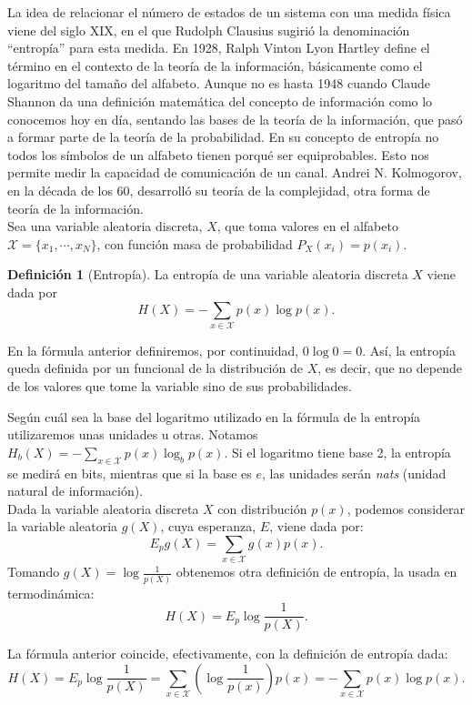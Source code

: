 \documentclass[10pt,a4paper]{article} %
\theoremstyle{definition}
\newtheorem{definition}{Definición}[section]
\begin{document}
    La idea de relacionar el número de estados de un sistema con una medida física viene del siglo XIX, en el que Rudolph Clausius sugirió la denominación ``entropía'' para esta medida. En 1928, Ralph Vinton Lyon Hartley define el término en el contexto de la teoría de la información, básicamente como el logaritmo del tamaño del alfabeto. Aunque no es hasta 1948 cuando Claude Shannon da una definición matemática del concepto de información como lo conocemos hoy en día,  sentando las bases de la teoría de la información, que pasó a formar parte de la teoría de la probabilidad. En su concepto de entropía no todos los símbolos de un alfabeto tienen porqué ser equiprobables. Esto nos permite medir la capacidad de comunicación de un canal. Andrei N. Kolmogorov, en la década de los 60, desarrolló su teoría de la complejidad, otra forma de teoría de la información.\\

Sea una variable aleatoria discreta, $X$, que toma valores en el alfabeto $\mathcal{X} = \{x_1, \cdots, x_N \}$, con función masa de probabilidad $P_X(x_i) = p(x_i)$.

\begin{definition}[Entropía]
  La entropía de una variable aleatoria discreta $X$ viene dada por \[H(X) = - \sum_{x\in \mathcal{X}} p(x) \log p(x).\]
\end{definition}

En la fórmula anterior definiremos, por continuidad, $0 \log 0 = 0$. Así, la entropía queda definida por un funcional de la distribución de $X$, es decir, que no depende de los valores que tome la variable sino de sus probabilidades.

Según cuál sea la base del logaritmo utilizado en la fórmula de la entropía utilizaremos unas unidades u otras. Notamos $H_b(X) = - \sum_{x\in \mathcal{X}} p(x) \log_b p(x)$. Si el logaritmo tiene base 2, la entropía se medirá en bits, mientras que si la base es $e$, las unidades serán \textit{nats} (unidad natural de información).\\

Dada la variable aleatoria discreta $X$ con distribución $p(x)$, podemos considerar la variable aleatoria $g(X)$, cuya esperanza, $E$, viene dada por:\[
E_pg(X) = \sum_{x\in \mathcal{X}}g(x)p(x).
\]
Tomando $g(X) = \log \frac{1}{p(X)}$ obtenemos otra definición de entropía, la usada en termodinámica:\[
H(X) = E_p \log \frac{1}{p(X)}.
\]

La fórmula anterior coincide, efectivamente, con la definición de entropía dada:\[
H(X) = E_p \log \frac{1}{p(X)} = \sum_{x\in \mathcal{X}}\left ( \log \frac{1}{p(x)} \right ) p(x) = - \sum_{x \in \mathcal{X}}p(x)\log p(x).
\]
\end{document}
